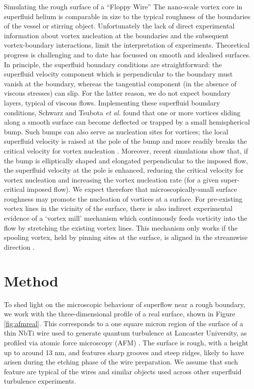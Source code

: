 \begin{chapter}{\label{cha:afm}Simulating the rough surface of a ``Floppy Wire''}
The nano-scale vortex core in superfluid helium is comparable in size 
to the typical roughness of the boundaries of the vessel or stirring object. 
Unfortunately the lack of direct experimental information about vortex 
nucleation at the boundaries and the subsequent vortex-boundary interactions,
limit the interpretation of experiments. Theoretical
progress is challenging and to date has focussed on smooth and idealised surfaces.  In principle, the superfluid boundary conditions
are straightforward:
the superfluid velocity
component which is perpendicular to the boundary must vanish
at the boundary, whereas the tangential component (in the absence of
viscous stresses) can slip.  For the latter reason, we do not expect boundary layers,
typical of viscous flows.   
Implementing these {superfluid} boundary conditions, 
Schwarz \cite{Schwarz-bump}
and Tsubota {\it et al.} \cite{PhysRevB.50.579}
found that one or more vortices sliding along a smooth surface
can become deflected or trapped by a small
hemispherical bump.  Such bumps can also serve as nucleation sites for vortices;  the local superfluid velocity is raised at the pole of the bump and more readily breaks the critical velocity for vortex nucleation \cite{win01}.  Moreover, recent simulations \cite{stagg_parker_14} show that, if
the bump is elliptically shaped and elongated perpendicular to the imposed flow, the superfluid velocity at the pole
is enhanced, reducing the critical velocity for vortex nucleation and increasing the vortex nucleation rate (for a given super-critical imposed flow). 
We expect therefore that microscopically-small surface roughness may promote the nucleation of vortices at a surface.
For pre-existing vortex lines in the vicinity of the surface, there is also indirect experimental evidence of a `vortex mill' mechanism 
which continuously feeds vorticity into the flow by stretching 
{the existing vortex} lines. This mechanism only works if the spooling vortex, 
held by pinning sites at the surface, is aligned in the streamwise direction \cite{PhysRevLett.64.1130}.

\section{Method\label{section:methodafm}}
To shed light on the microscopic behaviour of superflow near a rough
boundary, we work with the three-dimensional profile of a real surface, shown in Figure \ref{fig:afmreal}.  This corresponds to a one square micron region of the surface of a thin NbTi wire used to generate quantum turbulence at Lancaster University, as profiled via atomic force microscopy (AFM) \cite{Lawson}.  The surface is rough, with a height up to around 13 nm, and features sharp grooves and steep ridges, likely to have arisen during the etching phase of the wire preparation. We assume that such feature are typical of the wires and similar objects used across other superfluid turbulence experiments. 


\end{chapter}
